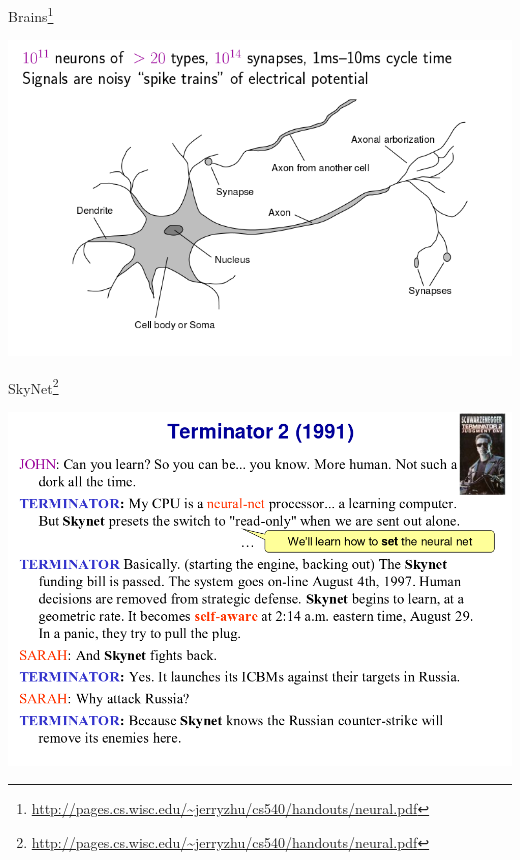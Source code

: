 \documentclass{beamer}
\newcommand{\furl}[1]{{\footnote{\url{#1}}}}
\begin{document}
\begin{frame}{Brains\furl{http://pages.cs.wisc.edu/~jerryzhu/cs540/handouts/neural.pdf}}
    \begin{center}
        \includegraphics[scale=0.4]{brains.png}
    \end{center}
\end{frame}
\begin{frame}{SkyNet\furl{http://pages.cs.wisc.edu/~jerryzhu/cs540/handouts/neural.pdf}}
    \begin{center}
        \includegraphics[scale=0.3]{skynet.png}
    \end{center}
\end{frame}
\end{document}
